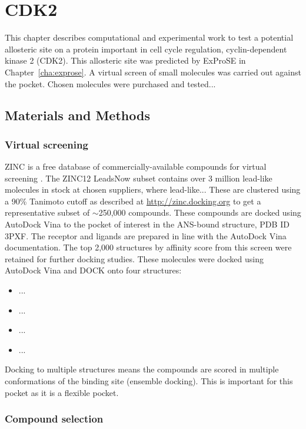 \chapter{CDK2}
\label{cha:cdk2}

This chapter describes computational and experimental work to test a potential allosteric site on a protein important in cell cycle regulation, cyclin-dependent kinase 2 (CDK2).
This allosteric site was predicted by ExProSE in Chapter~\ref{cha:exprose}.
A virtual screen of small molecules was carried out against the pocket.
Chosen molecules were purchased and tested...


\section{Materials and Methods}

\subsection{Virtual screening}

ZINC is a free database of commercially-available compounds for virtual screening \cite{Sterling2015}.
The ZINC12 LeadsNow subset contains over 3 million lead-like molecules in stock at chosen suppliers, where lead-like...
These are clustered using a 90\% Tanimoto cutoff as described at \url{http://zinc.docking.org} to get a representative subset of $\sim$250,000 compounds.
These compounds are docked using AutoDock Vina \cite{Trott2010} to the pocket of interest in the ANS-bound structure, PDB ID 3PXF.
The receptor and ligands are prepared in line with the AutoDock Vina documentation.
The top 2,000 structures by affinity score from this screen were retained for further docking studies.
These molecules were docked using AutoDock Vina and DOCK \cite{Allen2015} onto four structures:
\begin{itemize}
\item ...
\item ...
\item ...
\item ...
\end{itemize}
Docking to multiple structures means the compounds are scored in multiple conformations of the binding site (ensemble docking).
This is important for this pocket as it is a flexible pocket.


\subsection{Compound selection}


